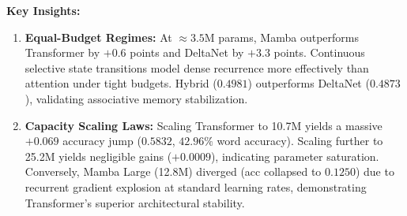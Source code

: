 \documentclass[12pt,a4paper]{article}
\begin{document}
\noindent\textbf{Key Insights:}
\begin{enumerate}[leftmargin=*]
    \item \textbf{Equal-Budget Regimes:} At $\approx 3.5\text{M}$ params, Mamba outperforms Transformer by $+0.6$ points and DeltaNet by $+3.3$ points. Continuous selective state transitions model dense recurrence more effectively than attention under tight budgets. Hybrid ($0.4981$) outperforms DeltaNet ($0.4873$), validating associative memory stabilization.
    \item \textbf{Capacity Scaling Laws:} Scaling Transformer to 10.7M yields a massive $+0.069$ accuracy jump ($0.5832$, $42.96\%$ word accuracy). Scaling further to 25.2M yields negligible gains ($+0.0009$), indicating parameter saturation. Conversely, Mamba Large (12.8M) diverged (acc collapsed to $0.1250$) due to recurrent gradient explosion at standard learning rates, demonstrating Transformer's superior architectural stability.
\end{enumerate}
\end{document}
